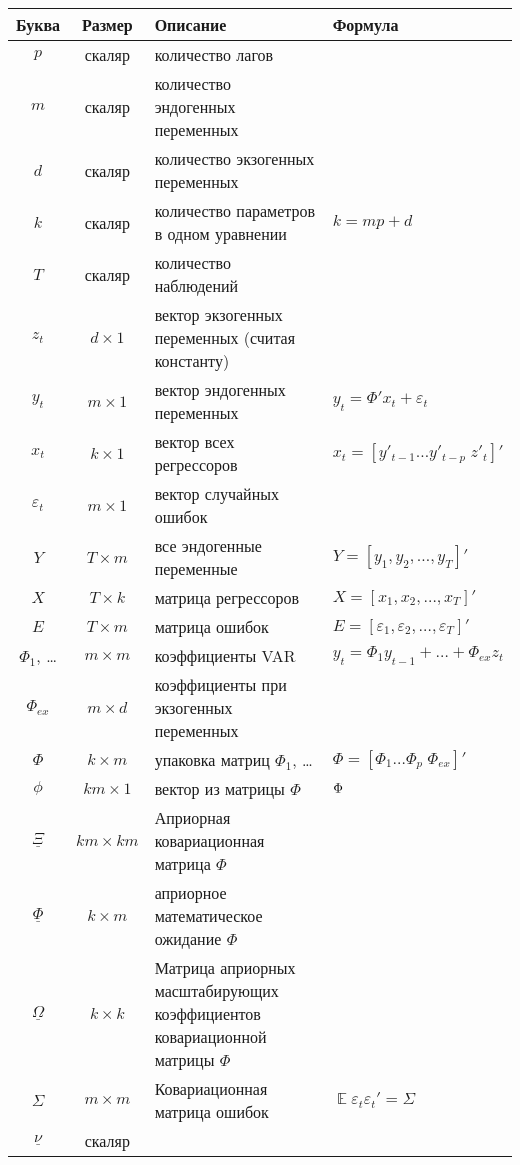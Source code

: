 \documentclass[11pt]{article} %
\DeclareMathOperator{\E}{\mathbb{E}}
\let\vec\relax
\DeclareMathOperator{\vec}{vec}
\begin{document}
\begin{center}
\begin{tabular}{ccp{6cm}l}
\toprule
Буква & Размер &  Описание & Формула \\
\midrule
$p$ & скаляр & количество лагов & \\
$m$ & скаляр & количество эндогенных переменных & \\
$d$ & скаляр & количество экзогенных переменных & \\
$k$ & скаляр & количество параметров в одном уравнении & $k=mp+d$ \\
$T$ & скаляр & количество наблюдений &  \\
\midrule
$z_t$ & $d \times 1$ & вектор экзогенных переменных (считая константу) & \\
$y_t$ & $m \times 1$ & вектор эндогенных переменных  & $y_t=\Phi' x_t+\varepsilon_t$ \\
$x_t$ & $k \times 1$ & вектор всех регрессоров & $x_t=[ y'_{t-1} \ldots  y'_{t-p} \; z'_t ]'$ \\
$\varepsilon_t$ & $m \times 1$ & вектор случайных ошибок  & \\
$Y$ & $T \times m$ & все эндогенные переменные & $Y=[y_1, y_2,\ldots, y_T]'$ \\
$X$ & $T \times k$ & матрица регрессоров& $X=[x_1, x_2,\ldots, x_T]'$ \\
$E$ & $T \times m$ & матрица ошибок & $E=[\varepsilon_1, \varepsilon_2,\ldots, \varepsilon_T]'$ \\
\midrule
$\Phi_1$, \ldots & $m \times m$ & коэффициенты VAR & $y_t= \Phi_1 y_{t-1} + \ldots + \Phi_{ex} z_t$ \\
$\Phi_{ex}$ & $m \times d$ & коэффициенты при экзогенных переменных & \\
$\Phi$ & $k \times m$ & упаковка матриц $\Phi_1$, \ldots & $\Phi=[ \Phi_1 \ldots \Phi_p \; \Phi_{ex}]'$ \\
$\phi$ & $km \times 1$ & вектор из матрицы $\Phi$ & $\vec{\Phi}$ \\
\midrule %
$\underline{\Xi}$ & $km \times km$  & Априорная ковариационная матрица $\Phi$& \\
$\underline \Phi$ & $k \times m$ & априорное математическое ожидание $\Phi$ & \\
\midrule %
$\underline{\Omega}$ & $k \times k$ & Матрица априорных масштабирующих коэффициентов ковариационной матрицы $\Phi$& \\
$\Sigma$ & $m \times m$ &Ковариационная матрица ошибок& $\E\varepsilon_t \varepsilon _t'=\Sigma$\\
$\underline{\nu}$ & скаляр & & \\
\bottomrule
\end{tabular}
\end{center}
\end{document}
